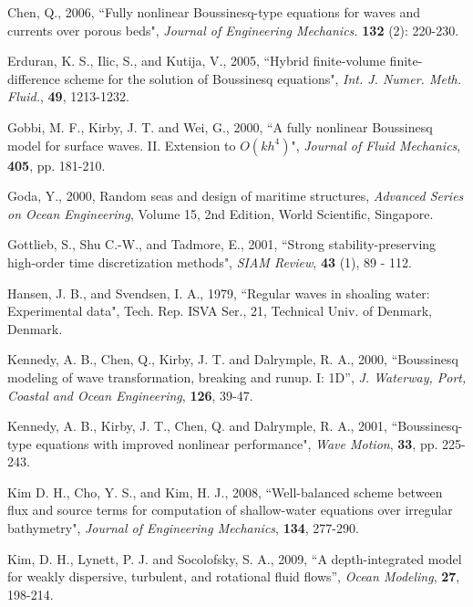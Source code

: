 \documentclass[11pt]{article}
\begin{document}
\begin{description}
\item Chen, Q., 2006, ``Fully nonlinear Boussinesq-type equations for waves and currents over porous beds", {\em  Journal of Engineering Mechanics.} {\bf 132} (2): 220-230.

\item Erduran, K. S., Ilic, S., and Kutija, V., 2005, ``Hybrid finite-volume finite-difference scheme for the solution of Boussinesq equations", {\em Int. J. Numer. Meth. Fluid.}, {\bf 49}, 1213-1232.

\item Gobbi, M. F., Kirby, J. T. and Wei, G., 2000,  ``A fully nonlinear Boussinesq model for surface waves. II. Extension to $O(kh^4)$", {\em Journal of Fluid Mechanics},  {\bf 405}, pp. 181-210.

\item Goda, Y., 2000, Random seas and design of maritime structures, {\em Advanced Series on Ocean Engineering}, Volume 15, 2nd Edition, World Scientific, Singapore. 

\item Gottlieb, S., Shu C.-W., and Tadmore, E., 2001, ``Strong stability-preserving high-order time discretization methods", {\em SIAM Review}, {\bf 43} (1), 89 - 112.

\item Hansen, J. B., and Svendsen, I. A., 1979,  ``Regular waves in shoaling water: Experimental data",  Tech. Rep. ISVA Ser., 21, Technical Univ. of Denmark, Denmark.

\item Kennedy, A. B., Chen, Q., Kirby, J. T. and Dalrymple, R. A., 2000, ``Boussinesq modeling of wave transformation, breaking and runup. I: 1D'', {\em J. Waterway, Port, Coastal and Ocean Engineering}, {\bf 126}, 39-47.

\item Kennedy, A. B., Kirby, J. T., Chen, Q. and Dalrymple, R. A., 2001,  ``Boussinesq-type equations with improved nonlinear performance", {\em Wave Motion},  {\bf 33}, pp. 225-243.

\item Kim D. H., Cho, Y. S., and Kim, H. J., 2008, ``Well-balanced scheme between flux and source terms for computation of shallow-water equations over irregular bathymetry", {\em Journal of Engineering Mechanics}, {\bf 134}, 277-290.

\item Kim, D. H., Lynett, P. J. and Socolofsky, S. A., 2009, ``A depth-integrated model for weakly dispersive, turbulent, and rotational
fluid flows'', {\em Ocean Modeling}, {\bf 27}, 198-214.


\end{description}
\end{document}
